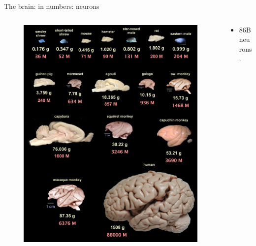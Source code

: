 \begin{frame}[c]{The brain: in numbers: neurons}
  \begin{columns}
    \begin{column}{0.5\textwidth}
      \begin{figure}[h]
        \centering
        \includegraphics[width=\textwidth]{images/brain-sizes.jpg}
      \end{figure}
    \end{column}
    \begin{column}{0.5\textwidth}
      \begin{itemize}
        \item \alert{86B} neurons\footnotemark{}.
      \end{itemize}
    \end{column}
  \end{columns}
  \vspace{0.2cm}
\end{frame}
